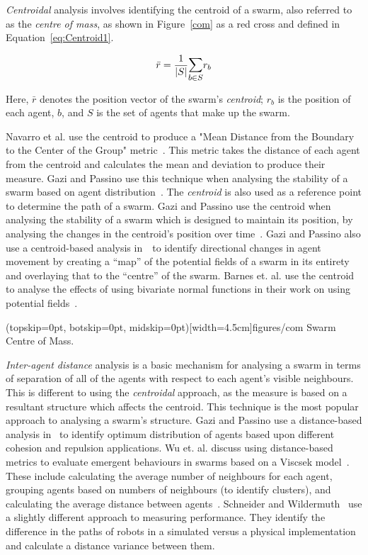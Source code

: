 \documentclass{ieeeaccess}
\newcommand{\card}[1]{\vert{#1}\vert}
\begin{document}
\textit{Centroidal} analysis involves identifying the centroid of a swarm, also
referred to as the \textit{centre of mass}, as shown in Figure~\ref{com} as a
red cross and defined in Equation~\ref{eq:Centroid1}. 

\begin{equation}\label{eq:Centroid1}
  \bar{r} = \frac{1}{\card{S}}\mathlarger{\sum_{b \in S}} r_b
\end{equation}

Here, $\bar{r}$ denotes the position vector of the swarm's \textit{centroid};
$r_b$ is the position of each agent, $b$, and $S$ is the set of agents that make
up the swarm.

Navarro et al. use the centroid to produce a "Mean Distance from the Boundary
to the Center of the Group" metric~\cite{NIM:09}. This metric takes the
distance of each agent from the centroid and calculates the mean and deviation
to produce their measure. Gazi and Passino use this technique when analysing
the stability of a swarm based on agent distribution~\cite{GP:11}. The
\textit{centroid} is also used as a reference point to determine the path of a
swarm. Gazi and Passino use the centroid when analysing the stability of a
swarm which is designed to maintain its position, by analysing the changes in
the centroid's position over time~\cite{GP:04}. Gazi and Passino also use a
centroid-based analysis in~\cite{GP:02}~to identify directional changes in
agent movement by creating a ``map'' of the potential fields of a swarm in its
entirety and overlaying that to the ``centre'' of the swarm.  Barnes et. al.
use the centroid to analyse the effects of using bivariate normal functions in
their work on using potential fields~\cite{BAF:06, BAFVM:06}. 

\Figure[t!](topskip=0pt, botskip=0pt, midskip=0pt)[width=4.5cm]{figures/com}
{Swarm Centre of Mass.\label{com}}

\textit{Inter-agent distance} analysis is a basic mechanism for analysing a
swarm in terms of separation of all of the agents with respect to each agent's
visible neighbours. This is different to using the \textit{centroidal} approach,
as the measure is based on a resultant structure which affects the centroid. 
This technique is the most popular approach to
analysing a swarm's structure. Gazi and Passino use a distance-based analysis
in~\cite{GP:04, GP:11} to identify optimum distribution of agents based upon
different cohesion and repulsion applications. Wu et. al. discuss using
distance-based metrics to evaluate emergent behaviours in swarms based on a
Viscsek model~\cite{WCW:11}. These include calculating the average number of
neighbours for each agent, grouping agents based on numbers of neighbours (to
identify clusters), and calculating the average distance between agents~\cite{WCW:11}.
Schneider and Wildermuth~\cite{SW:03} use a slightly different approach to
measuring performance. They identify the difference in the paths of robots in a
simulated versus a physical implementation and calculate a distance variance
between them.
\end{document}
